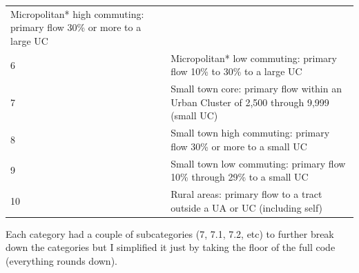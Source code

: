 \documentclass[10pt,]{article}
\begin{document}
\begin{longtable}[]{@{}ll@{}}
\begin{minipage}[t]{0.86\columnwidth}
Micropolitan* high commuting: primary flow 30\% or more to a large
UC\strut
\end{minipage}\tabularnewline
\begin{minipage}[t]{0.08\columnwidth}\raggedright
6\strut
\end{minipage} & \begin{minipage}[t]{0.86\columnwidth}\raggedright
Micropolitan* low commuting: primary flow 10\% to 30\% to a large
UC\strut
\end{minipage}\tabularnewline
\begin{minipage}[t]{0.08\columnwidth}\raggedright
7\strut
\end{minipage} & \begin{minipage}[t]{0.86\columnwidth}\raggedright
Small town core: primary flow within an Urban Cluster of 2,500 through
9,999 (small UC)\strut
\end{minipage}\tabularnewline
\begin{minipage}[t]{0.08\columnwidth}\raggedright
8\strut
\end{minipage} & \begin{minipage}[t]{0.86\columnwidth}\raggedright
Small town high commuting: primary flow 30\% or more to a small UC\strut
\end{minipage}\tabularnewline
\begin{minipage}[t]{0.08\columnwidth}\raggedright
9\strut
\end{minipage} & \begin{minipage}[t]{0.86\columnwidth}\raggedright
Small town low commuting: primary flow 10\% through 29\% to a small
UC\strut
\end{minipage}\tabularnewline
\begin{minipage}[t]{0.08\columnwidth}\raggedright
10\strut
\end{minipage} & \begin{minipage}[t]{0.86\columnwidth}\raggedright
Rural areas: primary flow to a tract outside a UA or UC (including
self)\strut
\end{minipage}\tabularnewline
\bottomrule
\end{longtable}

Each category had a couple of subcategories (7, 7.1, 7.2, etc) to
further break down the categories but I simplified it just by taking the
floor of the full code (everything rounds down).
\end{document}
